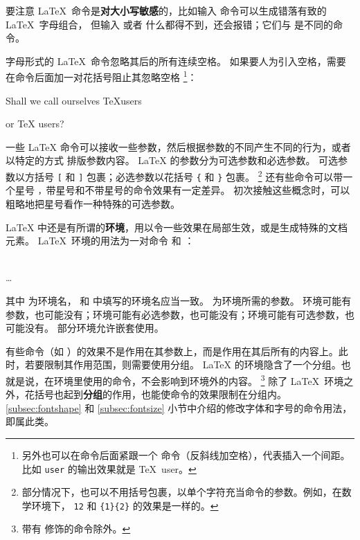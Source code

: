 要注意 \LaTeX\ 命令是\textbf{对大小写敏感}的，比如输入  命令可以生成错落有致的 \LaTeX\ 字母组合，
但输入  或者  什么都得不到，还会报错；它们与  是不同的命令。

字母形式的 \LaTeX\ 命令忽略其后的所有连续空格。
如果要人为引入空格，需要在命令后面加一对花括号阻止其忽略空格%
\footnote{另外也可以在命令后面紧跟一个 \cmd{\textvisiblespace} 命令（反斜线加空格），代表插入一个间距。
比如 \cmd{\textvisiblespace}\texttt{user} 的输出效果就是 \TeX\ user。}：
\begin{example}
Shall we call ourselves
\TeX users

or \TeX{} users?
\end{example}

一些 \LaTeX{} 命令可以接收一些参数，然后根据参数的不同产生不同的行为，或者以特定的方式
排版参数内容。
\LaTeX{} 的参数分为可选参数和必选参数。
可选参数以方括号 \texttt[ 和 \texttt] 包裹；必选参数以花括号 \texttt\{ 和 \texttt\} 包裹。%
\footnote{部分情况下，也可以不用括号包裹，以单个字符充当命令的参数。例如，在数学环境下，
\texttt{12} 和 \texttt{\{1\}\{2\}} 的效果是一样的。}
还有些命令可以带一个星号 \texttt*，带星号和不带星号的命令效果有一定差异。
初次接触这些概念时，可以粗略地把星号看作一种特殊的可选参数。

\LaTeX{} 中还是有所谓的\textbf{环境}，用以令一些效果在局部生效，或是生成特殊的文档元素。
\LaTeX\ 环境的用法为一对命令  和 ：
\begin{command}
 \\
\ldots \\
\end{command}

其中  为环境名， 和  中填写的环境名应当一致。
 为环境所需的参数。
环境可能有参数，也可能没有；环境可能有必选参数，也可能没有；环境可能有可选参数，也可能没有。
部分环境允许嵌套使用。

有些命令（如 ）的效果不是作用在其参数上，而是作用在其后所有的内容上。此时，若要限制其作用范围，则需要使用分组。
\LaTeX{} 的环境隐含了一个分组。也就是说，在环境里使用的命令，不会影响到环境外的内容。%
\footnote{带有  修饰的命令除外。}
除了 \LaTeX\ 环境之外，花括号也起到\textbf{分组}的作用，也能使命令的效果限制在分组内。
\ref{subsec:fontshape} 和 \ref{subsec:fontsize} 小节中介绍的修改字体和字号的命令用法，即属此类。

